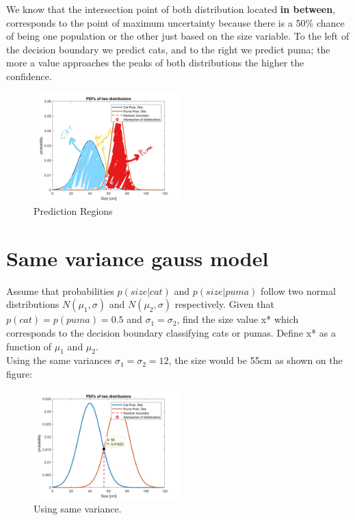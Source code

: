 \documentclass[]{article}
\begin{document}
We know that the intersection point of both distribution located \textbf{in between}, corresponds to the point of maximum uncertainty because there is a 50\% chance of being one population or the other just based on the size variable. To the left of the decision boundary we predict cats, and to the right we predict puma; the more a value approaches the peaks of both distributions the higher the confidence.

\begin{figure}[ht!]
\centering
\includegraphics[width=0.5\textwidth]{../img/1d-gauss-model-ink}
\caption{Prediction Regions}
\end{figure}

\section{Same variance gauss model}
Assume that probabilities $p(size|cat)$ and $p(size|puma)$ follow two normal distributions $N(\mu_1 , \sigma )$ and $N(\mu_2, \sigma)$ respectively. Given that $p(cat) = p(puma) = 0.5$ and $\sigma_1 = \sigma_2$, find the size value x* which corresponds to the decision boundary classifying cats or pumas. Define x* as a function of $\mu_1$ and $\mu_2$.\\

Using the same variances $\sigma_1 = \sigma_2 = 12$, the size would be 55cm as shown on the figure:

\begin{figure}[ht!]
\centering
\includegraphics[width=0.5\textwidth]{../img/1d-gauss-model-same-mean}
\caption{Using same variance.}
\end{figure}
\end{document}
